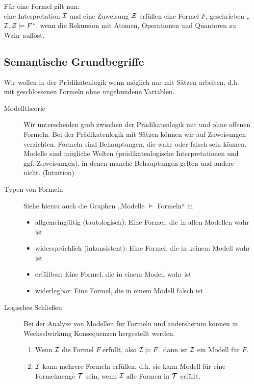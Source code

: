 \begin{description}
            Für eine Formel gilt nun: \\
            eine Interpretation $\mathcal{I}$ und eine Zuweisung $\mathcal{Z}$ \f{erfüllen} eine Formel $F$, geschrieben „$\mathcal{I}, \mathcal{Z} \models F$“, wenn die Rekursion mit Atomen, Operationen und Quantoren zu Wahr auflöst.
    \end{description}


\subsection{Semantische Grundbegriffe}
    Wir wollen in der Prädikatenlogik wenn möglich nur mit Sätzen arbeiten, d.h. mit geschlossenen Formeln ohne ungebundene Variablen. 
    \begin{description}
        \item[Modelltheorie] Wir unterscheiden grob zwischen der Prädikatenlogik mit und ohne offenen Formeln. Bei der Prädikatenlogik mit Sätzen können wir auf Zuweisungen verzichten. Formeln sind Behauptungen, die wahr oder falsch sein können. Modelle sind mögliche Welten (prädikatenlogische Interpretationen und ggf. Zuweisungen), in denen manche Behauptungen gelten und andere nicht. (\f{Intuition})

        \item[Typen von Formeln]
            Siehe hierzu auch die Graphen „Modelle $\models$ Formeln“ in 
            \begin{itemize}
                \item allgemeingültig (tautologisch): Eine Formel, die in allen Modellen wahr ist
                \item widersprüchlich (inkonsistent): Eine Formel, die in keinem Modell wahr ist
                \item erfüllbar: Eine Formel, die in einem Modell wahr ist
                \item widerlegbar: Eine Formel, die in einem Modell falsch ist
            \end{itemize}

        \item[Logisches Schließen] Bei der Analyse von Modellen für Formeln und andersherum können in Wechselwirkung Konsequenzen hergestellt werden.
            \begin{enumerate}
                \item Wenn $\mathcal{I}$ die Formel $F$ erfüllt, also $\mathcal{I} \models F$, dann ist $\mathcal{I}$ ein Modell für $F$.
                \item $\mathcal{I}$ kann mehrere Formeln erfüllen, d.h. sie kann Modell für eine Formelmenge $\mathcal{T}$ sein, wenn $\mathcal{I}$ alle Formen in $\mathcal{T}$ erfüllt.


\end{enumerate}
\end{description}
